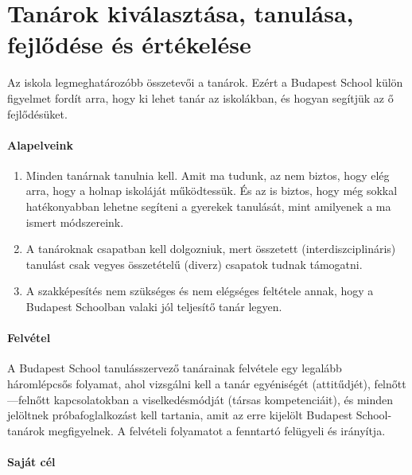 \hypertarget{tanarok-kivalasztasa-tanulasa-fejlodese-es-ertekelese}{%
\section{Tanárok kiválasztása, tanulása, fejlődése
és értékelése}\label{tanarok-kivalasztasa-tanulasa-fejlodese-es-ertekelese}}

Az iskola legmeghatározóbb összetevői a tanárok. Ezért a Budapest School
külön figyelmet fordít arra, hogy ki lehet tanár az iskolákban, és
hogyan segítjük az ő fejlődésüket.

\paragraph{Alapelveink}
        
\begin{enumerate}
\def\labelenumi{\arabic{enumi}.}
\tightlist
\item
  Minden tanárnak tanulnia kell. Amit ma tudunk, az nem biztos, hogy
  elég arra, hogy a holnap iskoláját működtessük. És az is biztos, hogy
  még sokkal hatékonyabban lehetne segíteni a gyerekek tanulását, mint
  amilyenek a ma ismert módszereink.
\item
  A tanároknak csapatban kell dolgozniuk, mert összetett
  (interdiszciplináris) tanulást csak vegyes összetételű (diverz)
  csapatok tudnak támogatni.
\item
  A szakképesítés nem szükséges és nem elégséges feltétele annak, hogy a
  Budapest Schoolban valaki jól teljesítő tanár legyen.
\end{enumerate}

\hypertarget{felvetel}{%
\paragraph{Felvétel}\label{felvetel}}

A Budapest School tanulásszervező tanárainak felvétele egy legalább
háromlépcsős folyamat, ahol vizsgálni kell a tanár egyéniségét
(attitűdjét), felnőtt---felnőtt kapcsolatokban a viselkedésmódját (társas
kompetenciáit), és minden jelöltnek próbafoglalkozást kell tartania,
amit az erre kijelölt Budapest School-tanárok megfigyelnek. A felvételi
folyamatot a fenntartó felügyeli és irányítja.

\hypertarget{sajat-cel}{%
\paragraph{Saját cél}\label{sajat-cel}}

